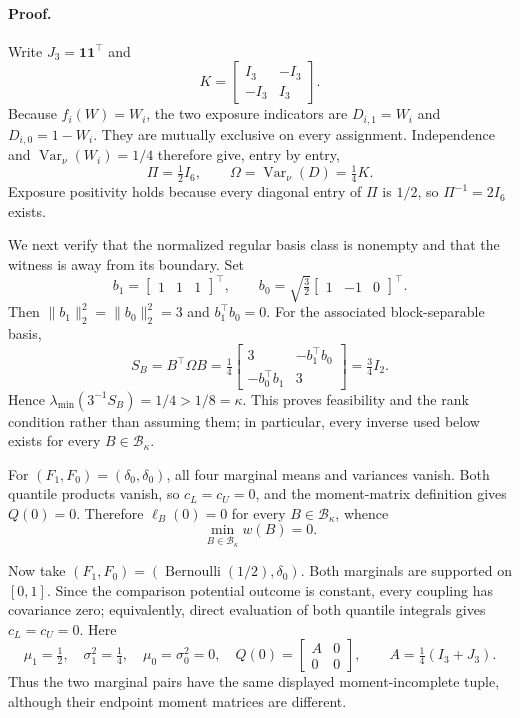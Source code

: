 \paragraph{Proof.}
Write \(J_3=\mathbf 1\mathbf 1^{\top}\) and
\[
K=\begin{bmatrix}I_3&-I_3\\-I_3&I_3\end{bmatrix}.
\]
Because \(f_i(W)=W_i\), the two exposure indicators are \(D_{i,1}=W_i\) and \(D_{i,0}=1-W_i\).  They are mutually exclusive on every assignment.  Independence and \(\operatorname{Var}_{\nu}(W_i)=1/4\) therefore give, entry by entry,
\[
\Pi=\tfrac12 I_6,
\qquad
\Omega=\operatorname{Var}_{\nu}(D)=\tfrac14K.
\]
Exposure positivity holds because every diagonal entry of \(\Pi\) is \(1/2\), so \(\Pi^{-1}=2I_6\) exists.

We next verify that the normalized regular basis class is nonempty and that the witness is away from its boundary.  Set
\[
b_1=\begin{bmatrix}1&1&1\end{bmatrix}^{\top},
\qquad
b_0=\sqrt{\tfrac32}\begin{bmatrix}1&-1&0\end{bmatrix}^{\top}.
\]
Then \(\lVert b_1\rVert_2^2=\lVert b_0\rVert_2^2=3\) and \(b_1^{\top}b_0=0\).  For the associated block-separable basis,
\[
S_B=B^{\top}\Omega B
=\tfrac14
\begin{bmatrix}
3&-b_1^{\top}b_0\\
-b_0^{\top}b_1&3
\end{bmatrix}
=\tfrac34I_2.
\]
Hence \(\lambda_{\min}(3^{-1}S_B)=1/4>1/8=\kappa\).  This proves feasibility and the rank condition rather than assuming them; in particular, every inverse used below exists for every \(B\in\mathcal B_\kappa\).

For \((F_1,F_0)=(\delta_0,\delta_0)\), all four marginal means and variances vanish.  Both quantile products vanish, so \(c_L=c_U=0\), and the moment-matrix definition gives \(Q(0)=0\).  Therefore \(\ell_B(0)=0\) for every \(B\in\mathcal B_\kappa\), whence
\[
\min_{B\in\mathcal B_\kappa}w(B)=0.
\]

Now take \((F_1,F_0)=(\operatorname{Bernoulli}(1/2),\delta_0)\).  Both marginals are supported on \([0,1]\).  Since the comparison potential outcome is constant, every coupling has covariance zero; equivalently, direct evaluation of both quantile integrals gives \(c_L=c_U=0\).  Here
\[
\mu_1=\tfrac12,
\quad \sigma_1^2=\tfrac14,
\quad \mu_0=\sigma_0^2=0,
\quad
Q(0)=\begin{bmatrix}A&0\\0&0\end{bmatrix},
\qquad
A=\tfrac14(I_3+J_3).
\]
Thus the two marginal pairs have the same displayed moment-incomplete tuple, although their endpoint moment matrices are different.

